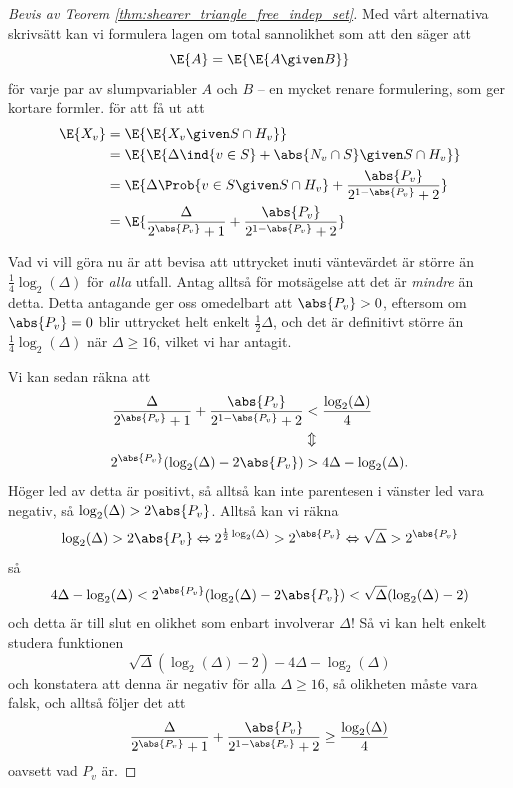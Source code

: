 \documentclass[nobib]{tufte-handout}
\begin{document}
\begin{proof}[Bevis av Teorem \ref{thm:shearer_triangle_free_indep_set}]
{  Med vårt alternativa skrivsätt kan vi formulera lagen om total sannolikhet som att den säger att
  $$\E{A} = \E{\E{A \given B}}$$
  för varje par av slumpvariabler $A$ och $B$ -- en mycket renare formulering, som ger kortare formler.}
  för att få ut att
  \begin{align*}
    \E{X_v} &= \E{\E{X_v \given S \cap H_v}}\\
    &= \E{\E{\Delta\ind{v \in S} + \abs{N_v \cap S} \given S \cap H_v}}\\
    &= \E{\Delta\Prob{v \in S \given S \cap H_v} + \frac{\abs{P_v}}{2^{1-\abs{P_v}} + 2}}\\
    &= \E{\frac{\Delta}{2^{\abs{P_v}} + 1} + \frac{\abs{P_v}}{2^{1-\abs{P_v}} + 2}}
  \end{align*}

  Vad vi vill göra nu är att bevisa att uttrycket inuti väntevärdet är större än $\frac{1}{4}\log_2(\Delta)$ för \emph{alla} utfall. Antag alltså för motsägelse att det är \emph{mindre} än detta. Detta antagande ger oss omedelbart att $\abs{P_v} > 0$, eftersom om $\abs{P_v} = 0$ blir uttrycket helt enkelt $\frac{1}{2}\Delta$, och det är definitivt större än $\frac{1}{4}\log_2(\Delta)$ när $\Delta \geq 16$, vilket vi har antagit.
  
  Vi kan sedan räkna att
  \begin{align*}
    \frac{\Delta}{2^{\abs{P_v}} + 1} + \frac{\abs{P_v}}{2^{1-\abs{P_v}} + 2} &< \frac{\log_2(\Delta)}{4}\\
    &\Updownarrow\\
    2^{\abs{P_v}}(\log_2(\Delta) - 2\abs{P_v}) &> 4 \Delta - \log_2(\Delta).
  \end{align*}
  Höger led av detta är positivt, så alltså kan inte parentesen i vänster led vara negativ, så $\log_2(\Delta) > 2\abs{P_v}$. Alltså kan vi räkna
  $$\log_2(\Delta) > 2\abs{P_v} \Leftrightarrow 2^{\frac{1}{2}\log_2(\Delta)} > 2^{\abs{P_v}} \Leftrightarrow \sqrt{\Delta} > 2^{\abs{P_v}}$$
  så
  \begin{align*}
    4\Delta - \log_2(\Delta) < 2^{\abs{P_v}}(\log_2(\Delta) - 2\abs{P_v}) < \sqrt{\Delta}(\log_2(\Delta) - 2)
  \end{align*}
  och detta är till slut en olikhet som enbart involverar $\Delta$! Så vi kan helt enkelt studera funktionen
  $$\sqrt{\Delta}(\log_2(\Delta) - 2) - 4\Delta - \log_2(\Delta)$$
  och konstatera att denna är negativ för alla $\Delta \geq 16$, så olikheten måste vara falsk, och alltså följer det att
  $$\frac{\Delta}{2^{\abs{P_v}} + 1} + \frac{\abs{P_v}}{2^{1-\abs{P_v}} + 2} \geq \frac{\log_2(\Delta)}{4}$$
  oavsett vad $P_v$ är.


\end{proof}
\end{document}
